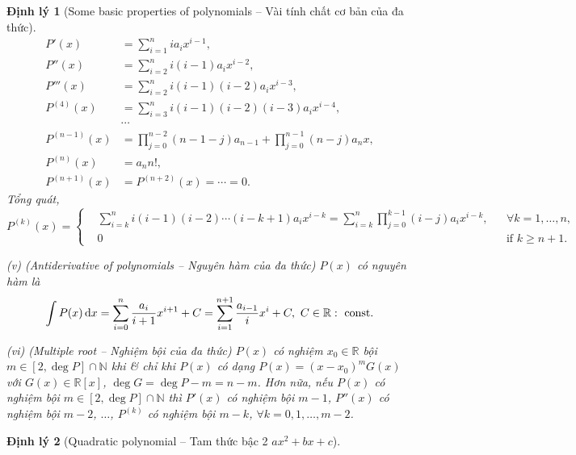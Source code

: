 \documentclass{article}
\newtheorem{dinhly}{Định lý}
\begin{document}
\begin{dinhly}[Some basic properties of polynomials -- Vài tính chất cơ bản của đa thức]
	\begin{align*}
		P'(x) &= \sum_{i=1}^n ia_ix^{i-1},\\
		P''(x) &= \sum_{i=2}^n i(i - 1)a_ix^{i-2},\\
		P'''(x) &= \sum_{i=2}^n i(i - 1)(i - 2)a_ix^{i-3},\\
		P^{(4)}(x) &= \sum_{i=3}^n i(i - 1)(i - 2)(i - 3)a_ix^{i-4},\\
		&\cdots\\
		P^{(n - 1)}(x) &= \prod_{j=0}^{n-2} (n - 1 - j)a_{n-1} + \prod_{j=0}^{n - 1} (n - j)a_nx,\\
		P^{(n)}(x) &= a_nn!,\\
		P^{(n + 1)}(x) &= P^{(n + 2)}(x) = \cdots = 0.
	\end{align*}
	Tổng quát,
	\begin{equation*}
		P^{(k)}(x) = \left\{\begin{split}
			&\sum_{i=k}^n i(i - 1)(i - 2)\cdots(i - k + 1)a_ix^{i - k} = \sum_{i=k}^n\prod_{j=0}^{k-1} (i - j)a_ix^{i - k},&&\forall k = 1,\ldots,n,\\
			&0&&\mbox{if } k\ge n + 1.
		\end{split}\right.
	\end{equation*}
	\item(v) {\rm(Antiderivative of polynomials -- Nguyên hàm của đa thức)} $P(x)$ có nguyên hàm là
	\begin{equation*}
		\int P(x)\,{\rm d}x = \sum_{i=0}^n \frac{a_i}{i + 1}x^{i + 1} + C = \sum_{i=1}^{n + 1} \frac{a_{i-1}}{i}x^i + C,\ C\in\mathbb{R}:\mbox{ const}.
	\end{equation*}	
	\item(vi) {\rm(Multiple root -- Nghiệm bội của đa thức)} $P(x)$ có nghiệm $x_0\in\mathbb{R}$ bội $m\in[2,\deg P]\cap\mathbb{N}$ khi \& chỉ khi $P(x)$ có dạng $P(x) = (x - x_0)^mG(x)$ với $G(x)\in\mathbb{R}[x]$, $\deg G = \deg P - m = n - m$. Hơn nữa, nếu $P(x)$ có nghiệm bội $m\in[2,\deg P]\cap\mathbb{N}$ thì $P'(x)$ có nghiệm bội $m - 1$, $P''(x)$ có nghiệm bội $m - 2$, $\ldots$, $P^{(k)}$ có nghiệm bội $m - k$, $\forall k = 0,1,\ldots,m - 2$.
\end{dinhly}

\begin{dinhly}[Quadratic polynomial -- Tam thức bậc 2 $ax^2 + bx + c$]
	
\end{dinhly}
\end{document}
